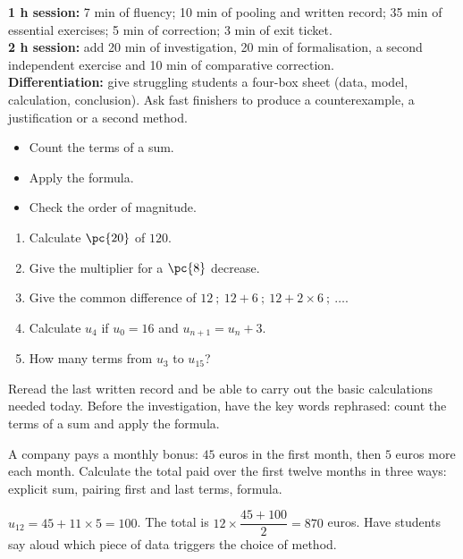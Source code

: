 \ifmxteacher
\begin{method}
\textbf{1 h session:} 7 min of fluency; 10 min of pooling and written record; 35 min of essential exercises; 5 min of correction; 3 min of exit ticket.\\
    \textbf{2 h session:} add 20 min of investigation, 20 min of formalisation, a second independent exercise and 10 min of comparative correction.\\
    \textbf{Differentiation:} give struggling students a four-box sheet (data, model, calculation, conclusion). Ask fast finishers to produce a counterexample, a justification or a second method.
\end{method}
\fi
{}
\begin{objectives}\begin{itemize}\item Count the terms of a sum.\item Apply the formula.\item Check the order of magnitude.\end{itemize}\end{objectives}
\begin{fluency}\begin{enumerate}\item Calculate $\pc{20}$ of $120$. \item Give the multiplier for a $\pc{8}$ decrease. \item Give the common difference of $12\ ;\ 12+6\ ;\ 12+2\times6\ ;\ \ldots$. \item Calculate $u_4$ if $u_0=16$ and $u_{n+1}=u_n+3$. \item How many terms from $u_3$ to $u_{15}$? \end{enumerate}\end{fluency}
\begin{prerequisites}Reread the last written record and be able to carry out the basic calculations needed today. Before the investigation, have the key words rephrased: count the terms of a sum and apply the formula.\end{prerequisites}

\begin{activity}
A company pays a monthly bonus: $45$ euros in the first month, then $5$ euros more each month. Calculate the total paid over the first twelve months in three ways: explicit sum, pairing first and last terms, formula.

\end{activity}
\begin{solution}$u_{12}=45+11\times5=100$. The total is $12\times\dfrac{45+100}{2}=870$ euros. Have students say aloud which piece of data triggers the choice of method.\end{solution}

